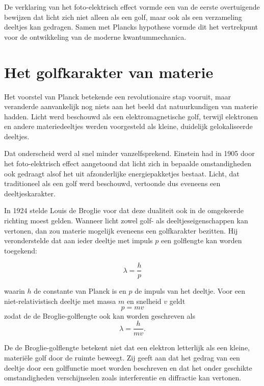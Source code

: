 De verklaring van het foto-elektrisch effect vormde een van de eerste overtuigende bewijzen dat licht zich niet alleen als een golf, maar ook als een verzameling deeltjes kan gedragen. Samen met Plancks hypothese vormde dit het vertrekpunt voor de ontwikkeling van de moderne kwantummechanica.

\section{Het golfkarakter van materie}

Het voorstel van Planck betekende een revolutionaire stap vooruit, maar veranderde aanvankelijk nog niets aan het beeld dat natuurkundigen van materie hadden. Licht werd beschouwd als een elektromagnetische golf, terwijl elektronen en andere materiedeeltjes werden voorgesteld als kleine, duidelijk gelokaliseerde deeltjes.

Dat onderscheid werd al snel minder vanzelfsprekend. Einstein had in 1905 door het foto-elektrisch effect aangetoond dat licht zich in bepaalde omstandigheden ook gedraagt alsof het uit afzonderlijke energiepakketjes bestaat. Licht, dat traditioneel als een golf werd beschouwd, vertoonde dus eveneens een deeltjeskarakter.

In 1924 stelde Louis de Broglie voor dat deze dualiteit ook in de omgekeerde richting moest gelden. Wanneer licht zowel golf- als deeltjeseigenschappen kan vertonen, dan zou materie mogelijk eveneens een golfkarakter bezitten. Hij veronderstelde dat aan ieder deeltje met impuls $p$ een golflengte kan worden toegekend:

\begin{equation}
\boxed{
\lambda=\frac{h}{p}
}
\end{equation}

waarin $h$ de constante van Planck is en $p$ de impuls van het deeltje. Voor een niet-relativistisch deeltje met massa $m$ en snelheid $v$ geldt
\begin{equation}
p=mv
\end{equation}
zodat de de Broglie-golflengte ook kan worden geschreven als
\begin{equation}
\lambda=\frac{h}{mv}.
\end{equation}

De de Broglie-golflengte betekent niet dat een elektron letterlijk als een kleine, materiële golf door de ruimte beweegt. Zij geeft aan dat het gedrag van een deeltje door een golffunctie moet worden beschreven en dat het onder geschikte omstandigheden verschijnselen zoals interferentie en diffractie kan vertonen.

